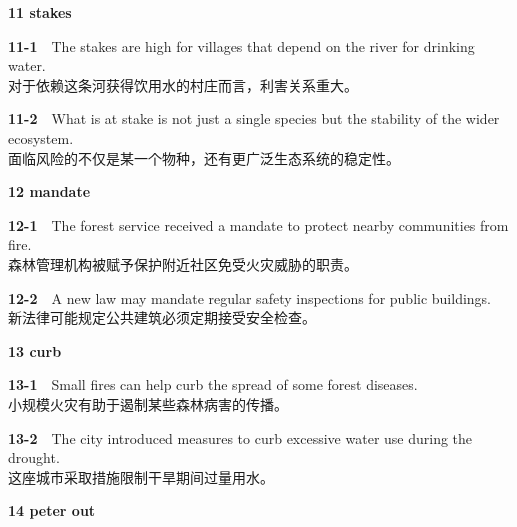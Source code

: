 \documentclass[a4paper,11pt,openany]{report}
\newcommand{\zhline}[1]{{\CJKsf\color{bodygrey}#1}}
\begin{document}
\textbf{11 stakes}

\begin{samepage}
\textbf{11-1}　The stakes are high for villages that depend on the river for drinking water.\\
\zhline{对于依赖这条河获得饮用水的村庄而言，利害关系重大。}
\par\end{samepage}

\begin{samepage}
\textbf{11-2}　What is at stake is not just a single species but the stability of the wider ecosystem.\\
\zhline{面临风险的不仅是某一个物种，还有更广泛生态系统的稳定性。}
\par\end{samepage}

\textbf{12 mandate}

\begin{samepage}
\textbf{12-1}　The forest service received a mandate to protect nearby communities from fire.\\
\zhline{森林管理机构被赋予保护附近社区免受火灾威胁的职责。}
\par\end{samepage}

\begin{samepage}
\textbf{12-2}　A new law may mandate regular safety inspections for public buildings.\\
\zhline{新法律可能规定公共建筑必须定期接受安全检查。}
\par\end{samepage}

\textbf{13 curb}

\begin{samepage}
\textbf{13-1}　Small fires can help curb the spread of some forest diseases.\\
\zhline{小规模火灾有助于遏制某些森林病害的传播。}
\par\end{samepage}

\begin{samepage}
\textbf{13-2}　The city introduced measures to curb excessive water use during the drought.\\
\zhline{这座城市采取措施限制干旱期间过量用水。}
\par\end{samepage}

\textbf{14 peter out}
\end{document}

